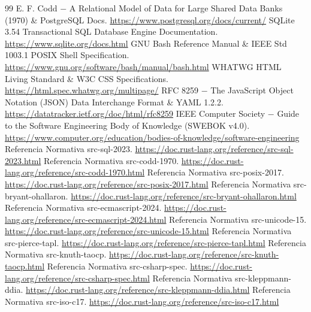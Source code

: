 \documentclass{book}
\begin{document}
\begin{thebibliography}{99}
 E. F. Codd \(-\) A Relational Model of Data for Large Shared Data Banks (1970) \& PostgreSQL Docs. \url{https://www.postgresql.org/docs/current/}
 SQLite 3.54 Transactional SQL Database Engine Documentation. \url{https://www.sqlite.org/docs.html}
 GNU Bash Reference Manual \& IEEE Std 1003.1 POSIX Shell Specification. \url{https://www.gnu.org/software/bash/manual/bash.html}
 WHATWG HTML Living Standard \& W3C CSS Specifications. \url{https://html.spec.whatwg.org/multipage/}
 RFC 8259 \(-\) The JavaScript Object Notation (JSON) Data Interchange Format \& YAML 1.2.2. \url{https://datatracker.ietf.org/doc/html/rfc8259}
 IEEE Computer Society \(-\) Guide to the Software Engineering Body of Knowledge (SWEBOK v4.0). \url{https://www.computer.org/education/bodies-of-knowledge/software-engineering}
 Referencia Normativa src-sql-2023. \url{https://doc.rust-lang.org/reference/src-sql-2023.html}
 Referencia Normativa src-codd-1970. \url{https://doc.rust-lang.org/reference/src-codd-1970.html}
 Referencia Normativa src-posix-2017. \url{https://doc.rust-lang.org/reference/src-posix-2017.html}
 Referencia Normativa src-bryant-ohallaron. \url{https://doc.rust-lang.org/reference/src-bryant-ohallaron.html}
 Referencia Normativa src-ecmascript-2024. \url{https://doc.rust-lang.org/reference/src-ecmascript-2024.html}
 Referencia Normativa src-unicode-15. \url{https://doc.rust-lang.org/reference/src-unicode-15.html}
 Referencia Normativa src-pierce-tapl. \url{https://doc.rust-lang.org/reference/src-pierce-tapl.html}
 Referencia Normativa src-knuth-taocp. \url{https://doc.rust-lang.org/reference/src-knuth-taocp.html}
 Referencia Normativa src-csharp-spec. \url{https://doc.rust-lang.org/reference/src-csharp-spec.html}
 Referencia Normativa src-kleppmann-ddia. \url{https://doc.rust-lang.org/reference/src-kleppmann-ddia.html}
 Referencia Normativa src-iso-c17. \url{https://doc.rust-lang.org/reference/src-iso-c17.html}
\end{thebibliography}
\end{document}
